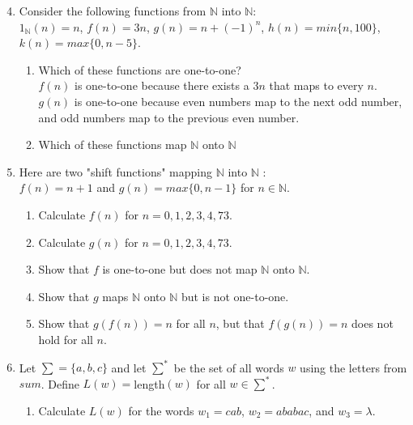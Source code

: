 \documentclass{article}
\newcommand{\N}{\mathbb{N}}
\begin{document}
\begin{enumerate}
\setcounter{enumi}{3}
\item Consider the following functions from $\N$  into $\N$:\\
$1_\N (n)=n$, $f(n) = 3n$, $g(n) = n+(-1)^n$, $h(n)=min\{n,100\}$, \\$k(n)=max\{0,n-5\}$.
	\begin{enumerate}
	\item Which of these functions are one-to-one?\\
	$f(n)$ is one-to-one because there exists a $3n$ that maps to every $n$.\\
	$g(n)$ is one-to-one because even numbers map to the next odd number, and odd numbers map to the previous even number.\\

	\item Which of these functions map $\N$ onto $\N$\\
	
	\end{enumerate}
\item Here are two "shift functions" mapping $\N$ into $\N$ :\\
$f(n)=n+1$ and $g(n)=max\{0,n-1\}$ for $n \in \N$.
	\begin{enumerate}
	\item Calculate $f(n)$ for $n=0,1,2,3,4,73$.\\

	\item Calculate $g(n)$ for $n=0,1,2,3,4,73$.\\

	\item Show that $f$ is one-to-one but does not map $\N$ onto $\N$.\\

	\item Show that $g$ maps $\N$ onto $\N$ but is not one-to-one.\\

	\item Show that $g(f(n))=n$ for all $n$, but that $f(g(n))=n$ does not hold for all $n$.\\
	
	\end{enumerate}
\item Let $\sum =\{a,b,c\}$ and let $\sum^\ast$ be the set of all words $w$ using the letters from $sum$. Define $L(w)=$length$(w)$ for all $w \in \sum^\ast$.
	\begin{enumerate}
	\item Calculate $L(w)$ for the words $w_1=cab$, $w_2=ababac$, and $w_3=\lambda$.\\


\end{enumerate}
\end{enumerate}
\end{document}
